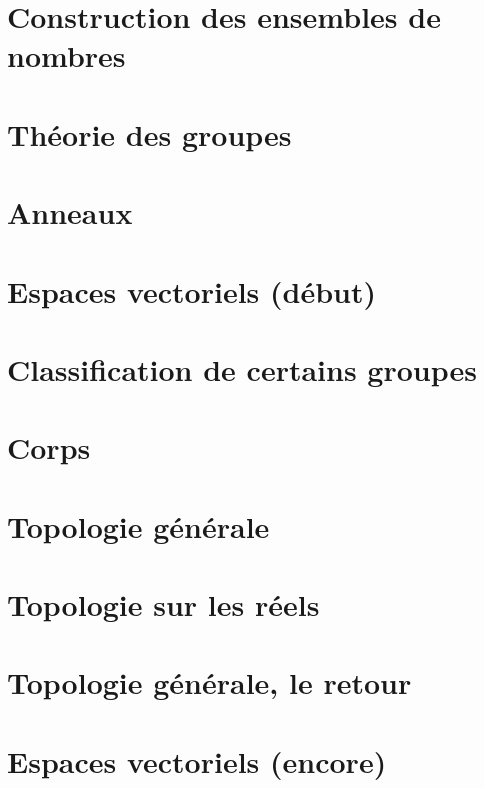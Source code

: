 \documentclass[a4paper,twoside,11pt]{book}
\begin{document}
\emptyInputPath
{}

\chapter{Construction des ensembles de nombres}


\chapter{Théorie des groupes}



\chapter{Anneaux}



\chapter{Espaces vectoriels (début)}


\chapter{Classification de certains groupes}


\chapter{Corps}




\chapter{Topologie générale}


\chapter{Topologie sur les réels}


\chapter{Topologie générale, le retour}




\chapter{Espaces vectoriels (encore)}






\end{document}
